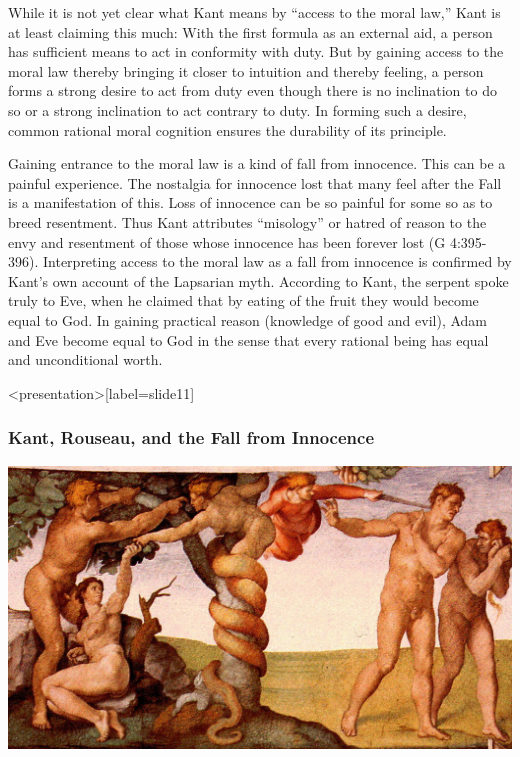 While it is not yet clear what Kant means by ``access to the moral law,'' Kant is at least claiming this much: With the first formula as an external aid, a person has sufficient means to act in conformity with duty. But by gaining access to the moral law thereby bringing it closer to intuition and thereby feeling, a person forms a strong desire to act from duty even though there is no inclination to do so or a strong inclination to act contrary to duty. In forming such a desire, common rational moral cognition ensures the durability of its principle.

Gaining entrance to the moral law is a kind of fall from innocence. This can be a painful experience. The nostalgia for innocence lost that many feel after the Fall is a manifestation of this. Loss of innocence can be so painful for some so as to breed resentment. Thus Kant attributes ``misology'' or hatred of reason to the envy and resentment of those whose innocence has been forever lost (G 4:395-396). Interpreting access to the moral law as a fall from innocence is confirmed by Kant's own account of the Lapsarian myth. According to Kant, the serpent spoke truly to Eve, when he claimed that by eating of the fruit they would become equal to God. In gaining practical reason (knowledge of good and evil), Adam and Eve become equal to God in the sense that every rational being has equal and unconditional worth. \change

% 


\begin{frame}<presentation>[label=slide11]
    \frametitle{Kant, Rouseau, and the Fall from Innocence}
        \includegraphics[width=\textwidth]{../../graphics/the_fall.jpg}
\end{frame}

